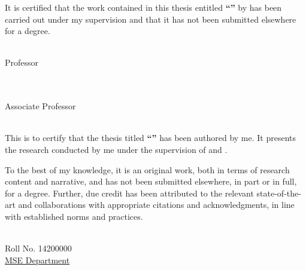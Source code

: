 \documentclass[11pt, a4paper, oneside]{Thesis} %
\begin{document}

\setcounter{page}{2}

\begin{minipage}{\textwidth}
    
    It is certified that the work contained in this thesis entitled \textbf{\enquote{\ttitle}} by \textbf{\authornames} has been carried out under my supervision and that it has not been submitted elsewhere for a degree.
        
\end{minipage}

\vspace{20.00mm}

\begin{minipage}{0.49\textwidth}
		\begin{flushleft}
			{\supnameA\\ 
			Professor\\
			\deptname\\
			\univname}
		\end{flushleft}
\end{minipage}
\begin{minipage}{0.49\textwidth}
	\begin{flushleft} \large
			{\supnameB\\
			Associate Professor\\
			\deptname\\
			\univname}
	\end{flushleft}		
\end{minipage}
\vfill
\clearpage %

This is to certify that the thesis titled \textbf{``\ttitle''} has been authored by me. It presents the research conducted by me under the supervision of \textbf{\supnameA} and \textbf{\supnameB}.\par

To the best of my knowledge, it is an original work, both in terms of research content and narrative, and has not been submitted elsewhere, in part or in full, for a degree. Further, due credit has been attributed to the relevant state-of-the-art and collaborations with appropriate citations and acknowledgments, in line with established norms and practices.\\ [2cm]
\begin{minipage}{.5\textwidth}
		\begin{flushleft}
			{\authornames\\ Roll No. 14200000 \\
			\normalsize{\href{http://www.iitk.ac.in/mse}{MSE Department}\\
			\univname}}
		\end{flushleft}
\end{minipage}
\vfill
\end{document}
